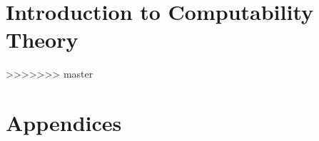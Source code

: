   \part{Introduction to Computability Theory}
  \label{part:computability}
  
  
  
  
  
  
>>>>>>> master

  \appendix
  \part{Appendices}
  

